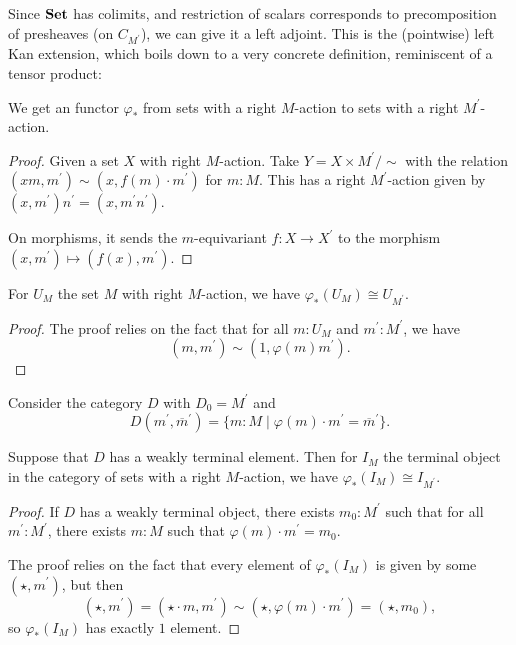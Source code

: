 Since $ \mathbf{Set} $ has colimits, and restriction of scalars corresponds to precomposition of presheaves (on $ C_{M^\prime} $), we can give it a left adjoint. This is the (pointwise) left Kan extension, which boils down to a very concrete definition, reminiscent of a tensor product:

\begin{lemma}\label{lem:scalar-extension}
  We get an  functor $ \varphi_* $ from sets with a right $ M $-action to sets with a right $ M^\prime $-action.
\end{lemma}
\begin{proof}
  Given a set $ X $ with right $ M $-action. Take $ Y = X \times M^\prime / \sim $ with the relation $ (x m, m^\prime) \sim (x, f(m) \cdot m^\prime) $ for $ m: M $. This has a right $ M^\prime $-action given by $ (x, m^\prime)n^\prime = (x, m^\prime n^\prime) $.

  On morphisms, it sends the $ m $-equivariant $ f: X \to X^\prime $ to the morphism $ (x, m^\prime) \mapsto (f(x), m^\prime) $.
\end{proof}

\begin{lemma}\label{lem:scalar-extension-monoid-monoid-action}
  For $ U_M $ the set $ M $ with right $ M $-action, we have $ \varphi_*(U_M) \cong U_{M^\prime} $.
\end{lemma}
\begin{proof}
  The proof relies on the fact that for all $ m: U_M $ and $ m^\prime : M^\prime $, we have
  \[ (m, m^\prime) \sim (1, \varphi(m) m^\prime). \]
\end{proof}

Consider the category $ D $ with $ D_0 = M^\prime $ and
\[ D(m^\prime, \overline m^\prime) = \{ m: M \mid \varphi(m) \cdot m^\prime = \overline m^\prime \}. \]

\begin{lemma}\label{lem:scalar-extension-terminal}
  Suppose that $ D $ has a weakly terminal element. Then for $ I_M $ the terminal object in the category of sets with a right $ M $-action, we have $ \varphi_*(I_M) \cong I_{M^\prime} $.
\end{lemma}
\begin{proof}
  If $ D $ has a weakly terminal object, there exists $ m_0 : M^\prime $ such that for all $ m^\prime: M^\prime $, there exists $ m: M $ such that $ \varphi(m) \cdot m^\prime = m_0 $.

  The proof relies on the fact that every element of $ \varphi_*(I_M) $ is given by some $ (\star, m^\prime) $, but then
  \[ (\star, m^\prime) = (\star \cdot m, m^\prime) \sim (\star, \varphi(m) \cdot m^\prime) = (\star, m_0), \]
  so $ \varphi_*(I_M) $ has exactly $ 1 $ element.
\end{proof}


